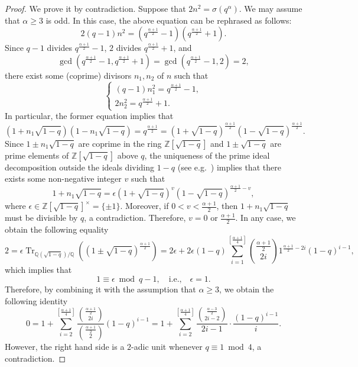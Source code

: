 \documentclass[11pt]{amsart}
\newcommand{\Q}{\mathbb{Q}}
\newcommand{\Z}{\mathbb{Z}}
\DeclareMathOperator{\Tr}{Tr} %
\theoremstyle{plain}
\theoremstyle{definition}
\begin{document}
\begin{proof}
We prove it by contradiction.
Suppose that $2n^{2} = \sigma(q^{\alpha})$.
We may assume that $\alpha \geq 3$ is odd.
In this case, the above equation can be rephrased as follows:
\[
	2(q-1)n^{2}
	= (q^{\frac{\alpha+1}{2}}-1)(q^{\frac{\alpha+1}{2}}+1).
\]
Since $q-1$ divides $q^{\frac{\alpha+1}{2}}-1$, $2$ divides $q^{\frac{\alpha+1}{2}}+1$, and 
\[
	\gcd(q^{\frac{\alpha+1}{2}}-1, q^{\frac{\alpha+1}{2}}+1)
	= \gcd(q^{\frac{\alpha+1}{2}}-1, 2)
	= 2,
\]
there exist some (coprime) divisors $n_{1}, n_{2}$ of $n$ such that 
\[
	\begin{cases}
	(q-1)n_{1}^{2} = q^{\frac{\alpha+1}{2}}-1, \\
	2n_{2}^{2} = q^{\frac{\alpha+1}{2}}+1.
	\end{cases}
\]
In particular, the former equation implies that
\[
	(1+n_{1}\sqrt{1-q})(1-n_{1}\sqrt{1-q})
	= q^{\frac{\alpha+1}{2}}
	= (1+\sqrt{1-q})^{\frac{\alpha+1}{2}}(1-\sqrt{1-q})^{\frac{\alpha+1}{2}}.
\]
Since $1 \pm n_{1}\sqrt{1-q}$ are coprime in the ring $\Z[\sqrt{1-q}]$
and $1 \pm \sqrt{1-q}$ are prime elements of $\Z[\sqrt{1-q}]$ above $q$,
the uniqueness of the prime ideal decomposition outside the ideals dividing $1-q$ (see e.g.\ \cite[\S7]{Cox})
implies that
there exists some non-negative integer $v$ such that
\[
	1+n_{1}\sqrt{1-q}
	= \epsilon(1+\sqrt{1-q})^{v}(1-\sqrt{1-q})^{\frac{\alpha+1}{2}-v},
\]
where $\epsilon \in \Z[\sqrt{1-q}]^{\times} = \{ \pm1 \}$.
Moreover,
if $0 < v < \frac{\alpha+1}{2}$,
then $1+n_{1}\sqrt{1-q}$ must be divisible by $q$,
a contradiction.
Therefore, $v = 0$ or $\frac{\alpha+1}{2}$.
In any case,
we obtain the following equality
\[
	2
	= \epsilon\Tr_{\Q(\sqrt{1-q})/\Q}((1 \pm \sqrt{1-q})^{\frac{\alpha+1}{2}})
	= 2\epsilon + 2\epsilon(1-q)\sum_{i = 1}^{\left[ \frac{\alpha+1}{4} \right]} \binom{\frac{\alpha+1}{2}}{2i} 1^{\frac{\alpha+1}{2}-2i} (1-q)^{i-1},
\]
which implies that
\[
	1 \equiv \epsilon \bmod q-1,
	\quad \text{i.e.,} \quad
	\epsilon = 1.
\]
Therefore,
by combining it with the assumption that $\alpha \geq 3$,
we obtain the following identity
\[
	0
	= 1 + \sum_{i = 2}^{\left[ \frac{\alpha+1}{4} \right]} \frac{\binom{\frac{\alpha+1}{2}}{2i}}{\binom{\frac{\alpha+1}{2}}{2}} (1-q)^{i-1}
	= 1 + \sum_{i = 2}^{\left[ \frac{\alpha+1}{4} \right]} \frac{\binom{\frac{\alpha-3}{2}}{2i-2}}{2i-1} \cdot \frac{(1-q)^{i-1}}{i}.
\]
However,
the right hand side is a $2$-adic unit whenever $q \equiv 1 \bmod 4$,
a contradiction.
\end{proof}
\end{document}
